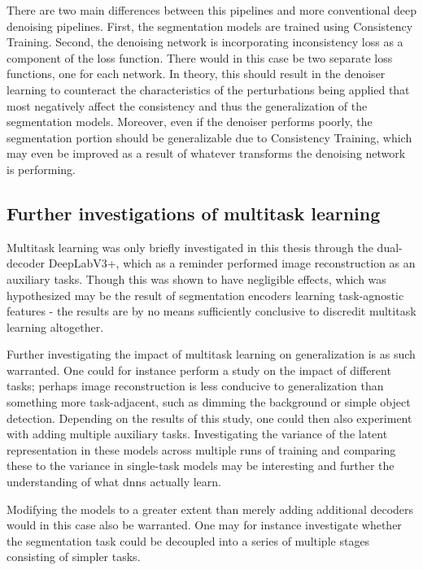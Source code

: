        There are two main differences between this pipelines and more conventional deep denoising pipelines. First, the segmentation models are trained using Consistency Training. Second, the denoising network is incorporating inconsistency loss as a component of the loss function. There would in this case be two separate loss functions, one for each network. In theory, this should result in the denoiser learning to counteract the characteristics of the perturbations being applied that most negatively affect the consistency and thus the generalization of the segmentation models. Moreover, even if the denoiser performs poorly, the segmentation portion should be generalizable due to Consistency Training, which may even be improved as a result of whatever transforms the denoising network is performing.
        
        
    \subsection{Further investigations of multitask learning}
        Multitask learning was only briefly investigated in this thesis through the dual-decoder DeepLabV3+, which as a reminder performed image reconstruction as an auxiliary tasks. Though this was shown to have negligible effects, which was hypothesized may be the result of segmentation encoders learning task-agnostic features - the results are by no means sufficiently conclusive to discredit multitask learning altogether. 
    
        Further investigating the impact of multitask learning on generalization is as such warranted. One could for instance perform a study on the impact of different tasks; perhaps image reconstruction is less conducive to generalization than something more task-adjacent, such as dimming the background or simple object detection. Depending on the results of this study, one could then also experiment with adding multiple auxiliary tasks. Investigating the variance of the latent representation in these models across multiple runs of training and comparing these to the variance in single-task models may be interesting and further the understanding of what \glspl{dnn} actually learn.
        
        Modifying the models to a greater extent than merely adding additional decoders would in this case also be warranted. One may for instance investigate whether the segmentation task could be decoupled into a series of multiple stages consisting of simpler tasks.
    
